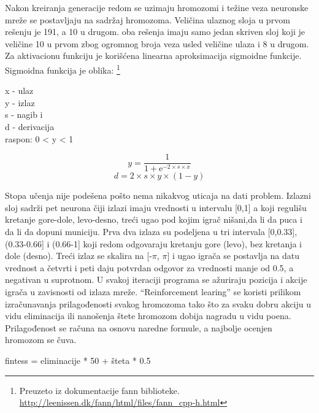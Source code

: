 \documentclass[a4paper]{article}
\begin{document}
\par Nakon kreiranja generacije redom se uzimaju hromozomi i težine veza neuronske mreže se postavljaju na sadržaj hromozoma. Veličina ulaznog sloja u prvom rešenju je 191, a 10 u drugom. oba rešenja imaju samo jedan skriven sloj koji je veličine 10 u prvom zbog ogromnog broja veza usled veličine ulaza i 8 u drugom. Za aktivacionu funkciju je korišćena linearna aproksimacija sigmoidne funkcije. Sigmoidna funkcija je oblika: \footnote{Preuzeto iz dokumentacije fann biblioteke. \url{http://leenissen.dk/fann/html/files/fann_cpp-h.html}}
\begin{tcolorbox}
\begin{center}
x - ulaz \\
y - izlaz \\ 
s - nagib i \\
d - derivacija \\
raspon: 0 < y < 1 \\
\end{center}
\begin{equation}
y = \frac{1}{1 + \mathrm{e}^{-2 \times s \times x}}
\end{equation}
\begin{equation}
d = 2 \times s \times y \times (1 - y)
\end{equation}
\end{tcolorbox}
\noindent  Stopa učenja nije podešena pošto nema nikakvog uticaja na dati problem. Izlazni sloj sadrži pet neurona čiji izlazi imaju vrednosti u intervalu [0,1] a koji regulišu kretanje gore-dole, levo-desno, treći ugao pod kojim igrač nišani,da li da puca i da li da dopuni municiju. Prva dva izlaza su podeljena u tri intervala [0,0.33], (0.33-0.66] i (0.66-1] koji redom odgovaraju kretanju gore (levo), bez kretanja i dole (desno). Treći izlaz se skalira na [-$\pi$, $\pi$] i ugao igrača se postavlja na datu vrednost a četvrti i peti daju potvrdan odgovor za vrednosti manje od 0.5, a negativan u suprotnom. U svakoj iteraciji programa se ažuriraju pozicija i akcije igrača u zavisnosti od izlaza mreže. “Reinforcement learing” se koristi prilikom izračunavanja prilagođenosti svakog hromozoma tako što za svaku dobru akciju u vidu eliminacija ili nanošenja štete hromozom dobija nagradu u vidu poena. Prilagođenost se računa na osnovu naredne formule, a najbolje ocenjen hromozom se čuva.
\begin{tcolorbox}
fintess = eliminacije * 50 + šteta * 0.5
\end{tcolorbox}
\end{document}
